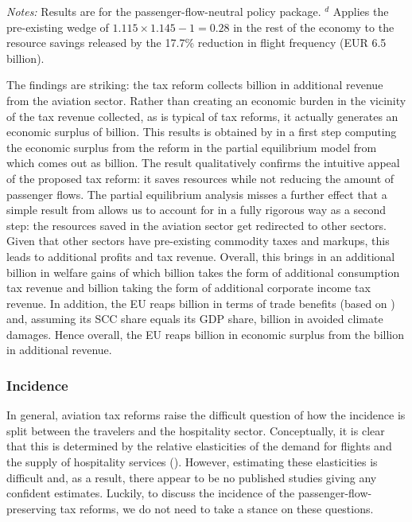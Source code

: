 \documentclass{article}
\begin{document}
\begin{table}[htbp]
\vspace{0.5em}
\begin{minipage}{\textwidth}
\footnotesize
\textit{Notes:} Results are for the passenger-flow-neutral policy package.
$^{d}$ Applies the pre-existing wedge of $1.115\times1.145-1=0.28$ in the rest of the economy to the resource savings released by the 17.7\% reduction in flight frequency (EUR 6.5 billion). %
\end{minipage}
\end{table}

The findings are striking: the tax reform collects  billion in additional revenue from the aviation sector. Rather than creating an economic burden in the vicinity of the tax revenue collected, as is typical of tax reforms, it actually generates an economic surplus of  billion. This results is obtained by in a first step computing the economic surplus from the reform in the partial equilibrium model from \cite{Dörpinghaus_et_al_2026} which comes out as  billion. The result qualitatively confirms the intuitive appeal of the proposed tax reform: it saves resources while not reducing the amount of passenger flows. The partial equilibrium analysis misses a further effect that a simple result from \citet{stern2026wedges} allows us to account for in a fully rigorous way as a second step: the resources saved in the aviation sector get redirected to other sectors. Given that other sectors have pre-existing commodity taxes and markups, this leads to additional profits and tax revenue. Overall, this brings in an additional  billion in welfare gains of which  billion takes the form of additional consumption tax revenue and  billion taking the form of additional corporate income tax revenue. In addition, the EU reaps  billion in terms of trade benefits (based on \citet{beaufils2025geopolitical}) and, assuming its SCC share equals its GDP share,  billion in avoided climate damages. Hence overall, the EU reaps  billion in economic surplus from the  billion in additional revenue. 


\subsubsection{Incidence}
In general, aviation tax reforms raise the difficult question of how the incidence is split between the travelers and the hospitality sector. Conceptually, it is clear that this is determined by the relative elasticities of the demand for flights and the supply of hospitality services (\citet{black2024destination}). However, estimating these elasticities is difficult and, as a result, there appear to be no published studies giving any confident estimates. %
Luckily, to discuss the incidence of the passenger-flow-preserving tax reforms, we do not need to take a stance on these questions.
\end{document}
